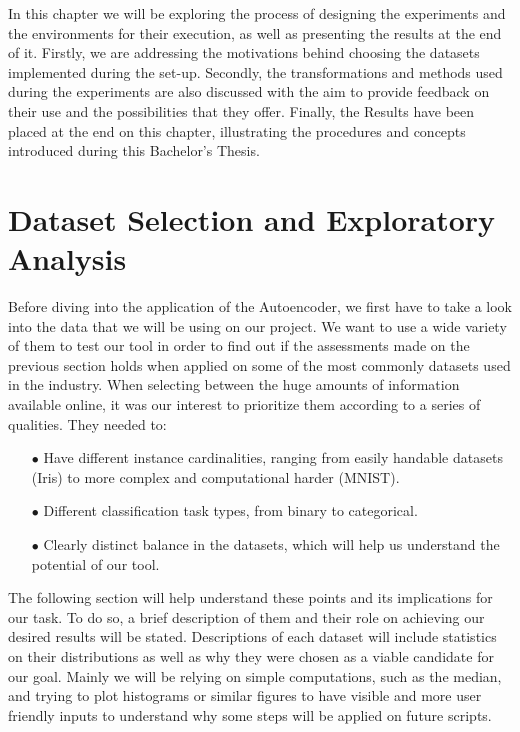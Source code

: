 In this chapter we will be exploring the process of designing the experiments and the environments for their execution, as well as presenting the results at the end of it. Firstly, we are addressing the motivations behind choosing the datasets implemented during the set-up. Secondly, the transformations and methods used during the experiments are also discussed with the aim to provide feedback on their use and the possibilities that they offer. Finally, the Results have been placed at the end on this chapter, illustrating the procedures and concepts introduced during this Bachelor's Thesis.

\section{Dataset Selection and Exploratory Analysis}

Before diving into the application of the Autoencoder, we first have to take a look into the data that we will be using on our project. We want to use a wide variety of them to test our tool in order to find out if the assessments made on the previous section holds when applied on some of the most commonly datasets used in the industry. When selecting between the huge amounts of information available online, it was our interest to prioritize them according to a series of qualities. They needed to:
 
\begin{itemize}
	
\item[$\bullet$] Have different instance cardinalities, ranging from easily handable datasets (Iris) to more complex and computational harder (MNIST).

\item[$\bullet$] Different classification task types, from binary to categorical.

\item[$\bullet$] Clearly distinct balance in the datasets, which will help us understand the potential of our tool.

\end{itemize}

The following section will help understand these points and its implications for our task. To do so, a brief description of them and their role on achieving our desired results will be stated. Descriptions of each dataset will include statistics on their distributions as well as why they were chosen as a viable candidate for our goal. Mainly we will be relying on simple computations, such as the median, and trying to plot histograms or similar figures to have visible and more user friendly inputs to understand why some steps will be applied on future scripts.\par
 
